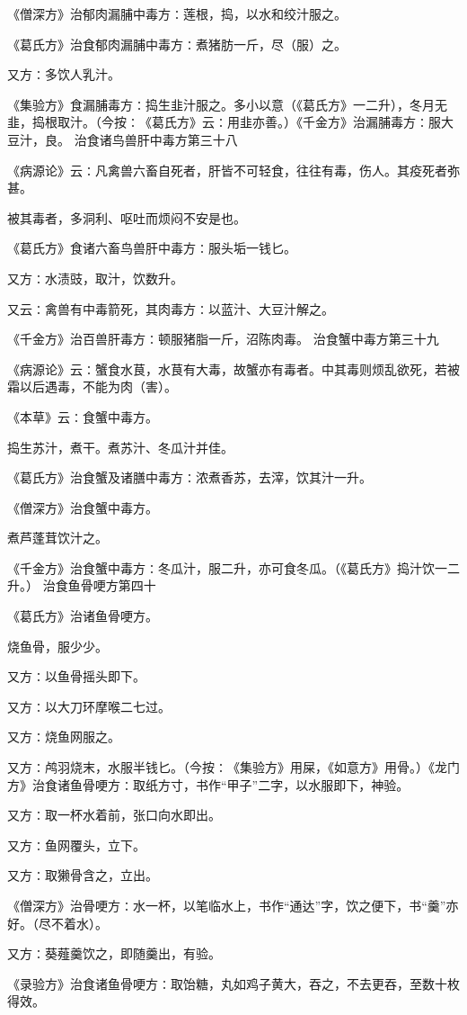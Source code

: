 \documentclass[a4paper,12pt,UTF8,twoside]{ctexbook}
\begin{document}
《僧深方》治郁肉漏脯中毒方∶莲根，捣，以水和绞汁服之。

《葛氏方》治食郁肉漏脯中毒方∶煮猪肪一斤，尽（服）之。

又方∶多饮人乳汁。

《集验方》食漏脯毒方∶捣生韭汁服之。多小以意（《葛氏方》一二升），冬月无韭，捣根取汁。（今按∶《葛氏方》云∶用韭亦善。）《千金方》治漏脯毒方∶服大豆汁，良。
治食诸鸟兽肝中毒方第三十八

《病源论》云∶凡禽兽六畜自死者，肝皆不可轻食，往往有毒，伤人。其疫死者弥甚。

被其毒者，多洞利、呕吐而烦闷不安是也。

《葛氏方》食诸六畜鸟兽肝中毒方∶服头垢一钱匕。

又方∶水渍豉，取汁，饮数升。

又云∶禽兽有中毒箭死，其肉毒方∶以蓝汁、大豆汁解之。

《千金方》治百兽肝毒方∶顿服猪脂一斤，沼陈肉毒。
治食蟹中毒方第三十九

《病源论》云∶蟹食水茛，水茛有大毒，故蟹亦有毒者。中其毒则烦乱欲死，若被霜以后遇毒，不能为肉（害）。

《本草》云∶食蟹中毒方。

捣生苏汁，煮干。煮苏汁、冬瓜汁并佳。

《葛氏方》治食蟹及诸膳中毒方∶浓煮香苏，去滓，饮其汁一升。

《僧深方》治食蟹中毒方。

煮芦蓬茸饮汁之。

《千金方》治食蟹中毒方∶冬瓜汁，服二升，亦可食冬瓜。（《葛氏方》捣汁饮一二升。）
治食鱼骨哽方第四十

《葛氏方》治诸鱼骨哽方。

烧鱼骨，服少少。

又方∶以鱼骨摇头即下。

又方∶以大刀环摩喉二七过。

又方∶烧鱼网服之。

又方∶鸬羽烧末，水服半钱匕。（今按∶《集验方》用屎，《如意方》用骨。）《龙门方》治食诸鱼骨哽方∶取纸方寸，书作“甲子”二字，以水服即下，神验。

又方∶取一杯水着前，张口向水即出。

又方∶鱼网覆头，立下。

又方∶取獭骨含之，立出。

《僧深方》治骨哽方∶水一杯，以笔临水上，书作“通达”字，饮之便下，书“羹”亦好。（尽不着水）。

又方∶葵薤羹饮之，即随羹出，有验。

《录验方》治食诸鱼骨哽方∶取饴糖，丸如鸡子黄大，吞之，不去更吞，至数十枚得效。
\end{document}
